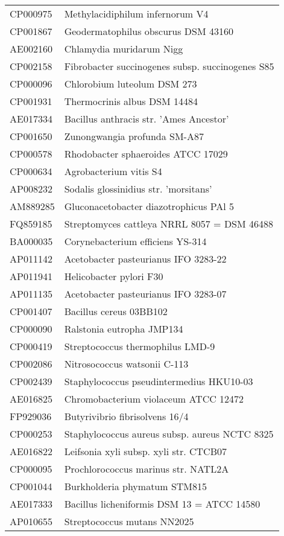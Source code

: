 \begin{longtable}{ll}
CP000975 & Methylacidiphilum infernorum V4\\
CP001867 & Geodermatophilus obscurus DSM 43160\\
AE002160 & Chlamydia muridarum Nigg\\
CP002158 & Fibrobacter succinogenes subsp. succinogenes S85\\
CP000096 & Chlorobium luteolum DSM 273\\
CP001931 & Thermocrinis albus DSM 14484\\
AE017334 & Bacillus anthracis str. 'Ames Ancestor'\\
CP001650 & Zunongwangia profunda SM-A87\\
CP000578 & Rhodobacter sphaeroides ATCC 17029\\
CP000634 & Agrobacterium vitis S4\\
AP008232 & Sodalis glossinidius str. 'morsitans'\\
AM889285 & Gluconacetobacter diazotrophicus PAl 5\\
FQ859185 & Streptomyces cattleya NRRL 8057 = DSM 46488\\
BA000035 & Corynebacterium efficiens YS-314\\
AP011142 & Acetobacter pasteurianus IFO 3283-22\\
AP011941 & Helicobacter pylori F30\\
AP011135 & Acetobacter pasteurianus IFO 3283-07\\
CP001407 & Bacillus cereus 03BB102\\
CP000090 & Ralstonia eutropha JMP134\\
CP000419 & Streptococcus thermophilus LMD-9\\
CP002086 & Nitrosococcus watsonii C-113\\
CP002439 & Staphylococcus pseudintermedius HKU10-03\\
AE016825 & Chromobacterium violaceum ATCC 12472\\
FP929036 & Butyrivibrio fibrisolvens 16/4\\
CP000253 & Staphylococcus aureus subsp. aureus NCTC 8325\\
AE016822 & Leifsonia xyli subsp. xyli str. CTCB07\\
CP000095 & Prochlorococcus marinus str. NATL2A\\
CP001044 & Burkholderia phymatum STM815\\
AE017333 & Bacillus licheniformis DSM 13 = ATCC 14580\\
AP010655 & Streptococcus mutans NN2025\\

\end{longtable}
